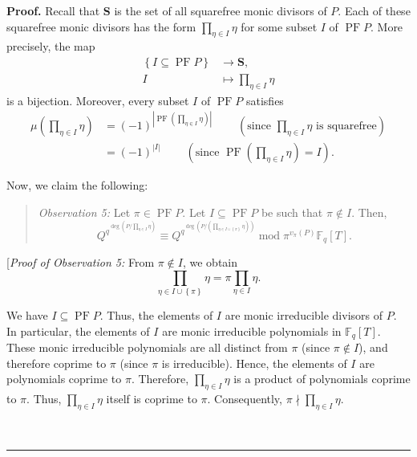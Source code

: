\documentclass[numbers=enddot,12pt,final,onecolumn,notitlepage]{scrartcl}%
\theoremstyle{definition}
\newenvironment{statement}{\begin{quote}}{\end{quote}}
\newenvironment{proof}[1][Proof]{\noindent\textbf{#1.} }{\ \rule{0.5em}{0.5em}}
\let\prodnonlimits\prod
\renewcommand{\prod}{\prodnonlimits\limits}
\begin{document}
\begin{proof}
Recall that $\mathbf{S}$ is the set of all squarefree monic divisors of $P$.
Each of these squarefree monic divisors has the form $\prod_{\eta\in I}\eta$
for some subset $I$ of $\operatorname*{PF}P$. More precisely, the map%
\begin{align}
\left\{  I\subseteq\operatorname*{PF}P\right\}   &  \rightarrow\mathbf{S}%
,\nonumber\\
I  &  \mapsto\prod_{\eta\in I}\eta\label{pf.cor.F.gW.example1.levent.2nd.bij}%
\end{align}
is a bijection. Moreover, every subset $I$ of $\operatorname*{PF}P$ satisfies
\begin{align}
\mu\left(  \prod_{\eta\in I}\eta\right)   &  =\left(  -1\right)  ^{\left\vert
\operatorname*{PF}\left(  \prod_{\eta\in I}\eta\right)  \right\vert
}\ \ \ \ \ \ \ \ \ \ \left(  \text{since }\prod_{\eta\in I}\eta\text{ is
squarefree}\right) \nonumber\\
&  =\left(  -1\right)  ^{\left\vert I\right\vert }\ \ \ \ \ \ \ \ \ \ \left(
\text{since }\operatorname*{PF}\left(  \prod_{\eta\in I}\eta\right)
=I\right)  . \label{pf.cor.F.gW.example1.levent.2nd.2}%
\end{align}


Now, we claim the following:

\begin{statement}
\textit{Observation 5:} Let $\pi\in\operatorname*{PF}P$. Let $I\subseteq
\operatorname*{PF}P$ be such that $\pi\notin I$. Then,
\[
Q^{q^{\deg\left(  P/\prod_{\eta\in I}\eta\right)  }}\equiv Q^{q^{\deg\left(
P/\left(  \prod_{\eta\in I\cup\left\{  \pi\right\}  }\eta\right)  \right)  }%
}\operatorname{mod}\pi^{v_{\pi}\left(  P\right)  }\mathbb{F}_{q}\left[
T\right]  .
\]

\end{statement}

[\textit{Proof of Observation 5:} From $\pi\notin I$, we obtain%
\begin{equation}
\prod_{\eta\in I\cup\left\{  \pi\right\}  }\eta=\pi\prod_{\eta\in I}\eta.
\label{pf.cor.F.gW.example1.levent.2nd.ob5.pf.1}%
\end{equation}


We have $I\subseteq\operatorname*{PF}P$. Thus, the elements of $I$ are monic
irreducible divisors of $P$. In particular, the elements of $I$ are monic
irreducible polynomials in $\mathbb{F}_{q}\left[  T\right]  $. These monic
irreducible polynomials are all distinct from $\pi$ (since $\pi\notin I$), and
therefore coprime to $\pi$ (since $\pi$ is irreducible). Hence, the elements
of $I$ are polynomials coprime to $\pi$. Therefore, $\prod_{\eta\in I}\eta$ is
a product of polynomials coprime to $\pi$. Thus, $\prod_{\eta\in I}\eta$
itself is coprime to $\pi$. Consequently, $\pi\nmid\prod_{\eta\in I}\eta$.


\end{proof}
\end{document}
